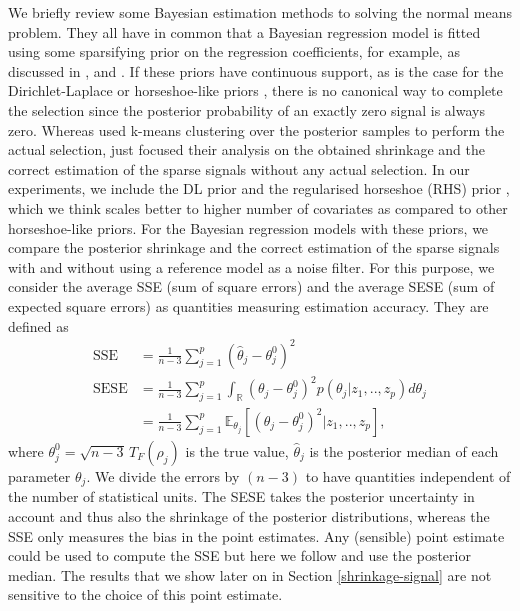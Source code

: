 \documentclass[american,]{article}
\theoremstyle{definition}
\begin{document}
We briefly review some Bayesian estimation methods to solving the
normal means problem. They all have in common that a Bayesian
regression model is fitted using some sparsifying prior on the
regression coefficients, for example, as discussed in
\cite{paper:dirichlet_laplace}, \cite{bhadra2017horseshoe+} and
\cite{johnstone2004needles}. If these priors have continuous support,
as is the case for the Dirichlet-Laplace
\cite[DL;][]{paper:dirichlet_laplace} or horseshoe-like priors
\citep{paper:hs,bhadra2017horseshoe+,paper:rhs}, there is no canonical
way to complete the selection since the posterior probability of an
exactly zero signal is always zero. Whereas
\cite{paper:dirichlet_laplace} used k-means clustering over the
posterior samples to perform the actual selection,
\cite{bhadra2017horseshoe+} just focused their analysis on the
obtained shrinkage and the correct estimation of the sparse signals
without any actual selection. In our experiments, we include the DL
prior and the regularised horseshoe (RHS) prior \citep{paper:rhs},
which we think scales better to higher number of covariates as
compared to other horseshoe-like priors. For the Bayesian regression
models with these priors, we compare the posterior shrinkage and the
correct estimation of the sparse signals with and without using a
reference model as a noise filter. For this purpose, we consider the
average SSE (sum of square errors) and the average SESE (sum of
expected square errors) as quantities measuring estimation
accuracy. They are defined as \
\begin{align}
\text{SSE}&=\frac{1}{n-3}\sum_{j=1}^{p}(\hat{\theta}_{j} - \theta^{0}_{j})^{2} \label{eq:SSE} \\
\text{SESE}&=\frac{1}{n-3}\sum_{j=1}^{p}\int_{\mathbb{R}}(\theta_{j}-\theta^{0}_{j})^{2}p(\theta_{j}|z_{1},..,z_{p})d\theta_{j} \\
&=\frac{1}{n-3}\sum_{j=1}^{p}\mathbb{E}_{\theta_{j}}[(\theta_{j}-\theta^{0}_{j})^{2}|z_{1},..,z_{p}], \label{eq:SESE}
\end{align}
where $\theta_{j}^{0}=\sqrt{n-3}\,T_{F}(\rho_{j})$ is the true value,
$\hat{\theta}_{j}$ is the posterior median of each parameter
$\theta_{j}$. We divide the errors by $(n-3)$ to have quantities
independent of the number of statistical units.  The SESE takes the
posterior uncertainty in account and thus also the shrinkage of the
posterior distributions, whereas the SSE only measures the bias in the
point estimates.  Any (sensible) point estimate could be used to
compute the SSE but here we follow \cite{paper:dirichlet_laplace} and
use the posterior median. The results that we show later on in Section
\ref{shrinkage-signal} are not sensitive to the choice of this point
estimate.
\end{document}
